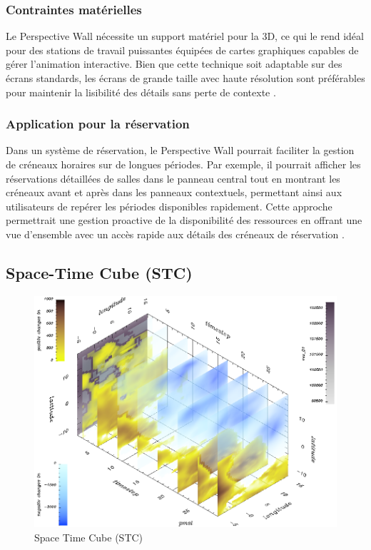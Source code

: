 \documentclass[runningheads]{llncs}
\begin{document}
\subsubsection{Contraintes matérielles}
Le Perspective Wall nécessite un support matériel pour la 3D, ce qui le rend idéal pour des stations de travail puissantes équipées de cartes graphiques capables de gérer l'animation interactive. Bien que cette technique soit adaptable sur des écrans standards, les écrans de grande taille avec haute résolution sont préférables pour maintenir la lisibilité des détails sans perte de contexte \cite{mackinlay_perspective_1991}.

\subsubsection{Application pour la réservation}
Dans un système de réservation, le Perspective Wall pourrait faciliter la gestion de créneaux horaires sur de longues périodes. Par exemple, il pourrait afficher les réservations détaillées de salles dans le panneau central tout en montrant les créneaux avant et après dans les panneaux contextuels, permettant ainsi aux utilisateurs de repérer les périodes disponibles rapidement. Cette approche permettrait une gestion proactive de la disponibilité des ressources en offrant une vue d’ensemble avec un accès rapide aux détails des créneaux de réservation \cite{mackinlay_perspective_1991}.


\subsection{Space-Time Cube (STC)}
\begin{figure}
    \centering
    \includegraphics[width=0.75\linewidth]{assets/space-time-cube.png}
    \caption{Space Time Cube (STC) \cite{bach_review_2014}}
    \label{fig:enter-label}
\end{figure}
\end{document}
